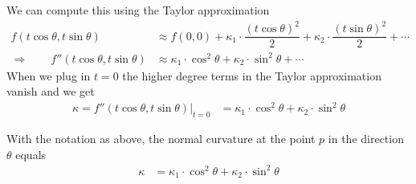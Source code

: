 We can compute this using the Taylor approximation
\begin{align*}
	f(t\cos \theta,t\sin \theta) &\approx f(0,0) + \kappa_1 \cdot \dfrac{(t \cos \theta)^2}{2} + \kappa_2 \cdot \dfrac{(t \sin \theta)^2}{2} + \cdots \\
	\Rightarrow \qquad
	f''(t\cos \theta,t\sin \theta) &\approx  \kappa_1 \cdot \cos^2 \theta + \kappa_2 \cdot \sin^2 \theta + \cdots
\end{align*}
When we plug in $t=0$ the higher degree terms in the Taylor approximation vanish and we get
\begin{align*}
	\kappa = f''(t\cos \theta,t\sin \theta)|_{t=0} &=  \kappa_1 \cdot \cos^2 \theta + \kappa_2 \cdot \sin^2 \theta
\end{align*}

\begin{prop}
	With the notation as above, the normal curvature at the point $p$ in the direction $\theta$ equals
	  \begin{align*}
			\kappa &=  \kappa_1 \cdot \cos^2 \theta + \kappa_2 \cdot \sin^2 \theta
	  \end{align*}
\end{prop}

